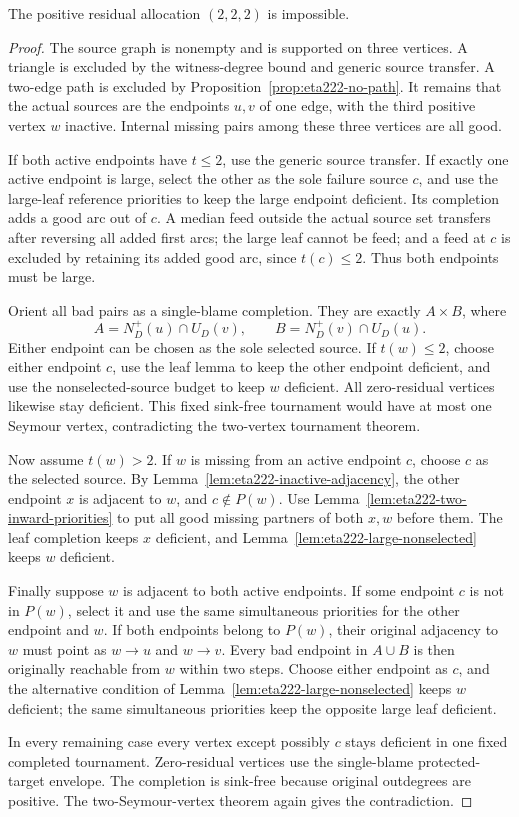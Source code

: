 \begin{theorem}[Exclusion of $(2,2,2)$]
\label{thm:eta222-excluded}
The positive residual allocation $(2,2,2)$ is impossible.
\end{theorem}

\begin{proof}
The source graph is nonempty and is supported on three vertices.
A triangle is excluded by the witness-degree bound and generic
source transfer. A two-edge path is excluded by
Proposition~\ref{prop:eta222-no-path}. It remains that the actual
sources are the endpoints $u,v$ of one edge, with the third positive
vertex $w$ inactive. Internal missing pairs among these three
vertices are all good.

If both active endpoints have $t\le2$, use the generic source
transfer. If exactly one active endpoint is large, select the other
as the sole failure source $c$, and use the large-leaf reference
priorities to keep the large endpoint deficient. Its completion
adds a good arc out of $c$. A median feed outside the actual source
set transfers after reversing all added first arcs; the large leaf
cannot be feed; and a feed at $c$ is excluded by retaining its added
good arc, since $t(c)\le2$. Thus both endpoints must be large.

Orient all bad pairs as a single-blame completion. They are exactly
$A\times B$, where
\[
 A=N_D^+(u)\cap U_D(v),\qquad
 B=N_D^+(v)\cap U_D(u).
\]
Either endpoint can be chosen as the sole selected source. If
$t(w)\le2$, choose either endpoint $c$, use the leaf lemma
to keep the other endpoint deficient, and use the nonselected-source
budget to keep $w$ deficient. All zero-residual vertices likewise
stay deficient. This fixed sink-free tournament would have at most
one Seymour vertex, contradicting the two-vertex tournament theorem.

Now assume $t(w)>2$. If $w$ is missing from an active endpoint
$c$, choose $c$ as the selected source. By
Lemma~\ref{lem:eta222-inactive-adjacency}, the other endpoint $x$
is adjacent to $w$, and $c\notin P(w)$.
Use Lemma~\ref{lem:eta222-two-inward-priorities} to put all good
missing partners of both $x,w$ before them. The leaf
completion keeps $x$ deficient, and
Lemma~\ref{lem:eta222-large-nonselected} keeps $w$ deficient.

Finally suppose $w$ is adjacent to both active endpoints. If some
endpoint $c$ is not in $P(w)$, select it and use the same simultaneous
priorities for the other endpoint and $w$. If both endpoints belong
to $P(w)$, their original adjacency to $w$ must point as
$w\to u$ and $w\to v$. Every bad endpoint in $A\cup B$ is then
originally reachable from $w$ within two steps. Choose either endpoint
as $c$, and the alternative condition of
Lemma~\ref{lem:eta222-large-nonselected} keeps $w$ deficient;
the same simultaneous priorities keep the opposite large leaf
deficient.

In every remaining case every vertex except possibly $c$ stays
deficient in one fixed completed tournament. Zero-residual vertices
use the single-blame protected-target envelope. The
completion is sink-free because original outdegrees are positive.
The two-Seymour-vertex theorem again gives the contradiction.
\end{proof}
